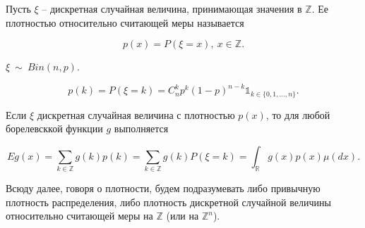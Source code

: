\newcommand{\nequiv}{\not\equiv}

\begin{definition}
Пусть $\displaystyle \xi $ -- дискретная случайная величина, принимающая значения в $\displaystyle \mathbb{Z}$. Ее плотностью относительно считающей меры называется

\begin{equation*}
p( x) =P( \xi =x) ,\ x\in \mathbb{Z} .
\end{equation*}
\end{definition}
\begin{example}
$\displaystyle \xi \ \sim \ Bin( n,p)$.


\begin{equation*}
p( k) =P( \xi =k) =C_{n}^{k} p^{k}( 1-p)^{n-k}\mathbb{1}_{k\in \{0,1,\dotsc ,n\}} .
\end{equation*}
\end{example}
Если $\displaystyle \xi $ дискретная случайная величина с плотностью $\displaystyle p( x)$, то для любой борелевсккой функции $\displaystyle g$ выполняется


\begin{equation*}
Eg( x) =\sum _{k\in \mathbb{Z}} g( k) p( k) =\sum _{k\in \mathbb{Z}} g( k) P( \xi =k) =\int _{\mathbb{R}} g( x) p( x) \mu ( dx) .
\end{equation*}
\begin{note}
Всюду далее, говоря о плотности, будем подразумевать либо привычную плотность распределения, либо плотность дискретной случайной величины относительно считающей меры на $\displaystyle \mathbb{Z}$ (или на $\displaystyle \mathbb{Z}^{n}$).
\end{note}
